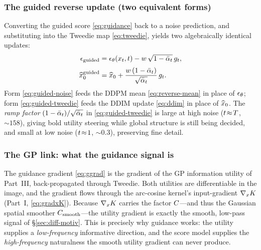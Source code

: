 \subsubsection{The guided reverse update (two equivalent forms)}
Converting the guided score \eqref{eq:guidance} back to a noise prediction, and
substituting into the Tweedie map \eqref{eq:tweedie}, yields two algebraically
identical updates:
\begin{align}
\epsilon_{\mathrm{guided}} &= \epsilon_{\theta}(x_{t},t)-w\,\sqrt{1-\bar{\alpha}_{t}}\,g_{t},
   \label{eq:guided-noise}\\[2pt]
\widehat{x}_{0}^{\mathrm{guided}} &= \widehat{x}_{0}+\frac{w\,(1-\bar{\alpha}_{t})}{\sqrt{\bar{\alpha}_{t}}}\,g_{t}.
   \label{eq:guided-tweedie}
\end{align}
Form \eqref{eq:guided-noise} feeds the DDPM mean \eqref{eq:reverse-mean} in place
of $\epsilon_{\theta}$; form \eqref{eq:guided-tweedie} feeds the DDIM update \eqref{eq:ddim}
in place of $\widehat{x}_{0}$. The \emph{ramp factor} $(1-\bar{\alpha}_{t})/\sqrt{\bar{\alpha}_{t}}$ in
\eqref{eq:guided-tweedie} is large at high noise ($t\!\approx\!T$, $\sim\!158$),
giving bold utility steering while global structure is still being decided, and
small at low noise ($t\!\approx\!1$, $\sim\!0.3$), preserving fine detail.

\subsubsection{The GP link: what the guidance signal is}\label{sec:diff-gplink}
The guidance gradient \eqref{eq:ggrad} is the gradient of the GP information
utility of Part~III, back-propagated through Tweedie. Both utilities are
differentiable in the image, and the gradient flows through the arc-cosine
kernel's input-gradient $\nabla_{x}K$ (Part~I, \eqref{eq:gradxK}). Because
$\nabla_{x}K$ carries the factor $C$---and thus the Gaussian spatial
smoother $C_{\mathrm{smooth}}$---the utility gradient is exactly the smooth, low-pass signal of
\S\ref{sec:diff-motiv}. This is precisely why guidance works: the utility supplies
a \emph{low-frequency} informative direction, and the score model supplies the
\emph{high-frequency} naturalness the smooth utility gradient can never produce.

